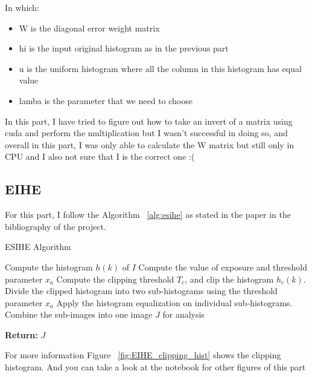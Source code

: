 \documentclass{article}
\begin{document}
	In which:
	\begin{itemize}
		\item W is the diagonal error weight matrix
		\item hi is the input original histogram as in the previous part
		\item u is the uniform histogram where all the column in this histogram has equal value
		\item lamba is the parameter that we need to choose
	\end{itemize}
	
	In this part, I have tried to figure out how to take an invert of a matrix using cuda and perform the multiplication but I wasn't successful in doing so, and overall in this part, I was only able to calculate the W matrix but still only in CPU and I also not sure that I is the correct one :(
	
	\subsection{EIHE}
	
	For this part, I follow the Algorithm ~\ref{alg:esihe} as stated in the paper in the bibliography of the project.
	
	\begin{algorithm}[H] %
		\caption{ESIHE Algorithm}
		\label{alg:esihe}
		\begin{algorithmic}[1]
			
			\State Compute the histogram $h(k)$ of $I$
			\State Compute the value of exposure and threshold parameter $x_a$
			\State Compute the clipping threshold $T_c$, and clip the histogram $h_c(k)$.
			\State Divide the clipped histogram into two sub-histograms using the threshold parameter $x_a$
			\State Apply the histogram equalization on individual sub-histograms.
			\State Combine the sub-images into one image $J$ for analysis
			
			\State \textbf{Return:} $J$
			
		\end{algorithmic}
	\end{algorithm}
	
	For more information Figure ~\ref{fig:EIHE_clipping_hist} shows the clipping histogram. And you can take a look at the notebook for other figures of this part
	
\end{document}
